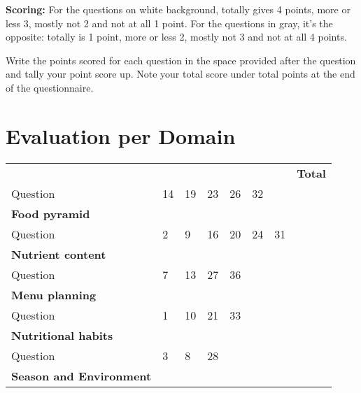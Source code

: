 \documentclass[../main.tex]{subfiles}
\begin{document}
\textbf{Scoring:} For the questions on white background, totally gives 4 points, more or less 3, mostly not 2 and not at all 1 point. For the questions in gray, it's the opposite:  totally is 1 point, more or less 2, mostly not 3 and not at all 4 points.

Write the points scored for each question in the space provided after the question and tally your point score up. Note your total score under total points at the end of the questionnaire.

\section{Evaluation per Domain}

\begin{tabular}{l|p{10mm}|p{10mm}|p{10mm}|p{10mm}|p{10mm}|p{10mm}||l}
  & & & & & & & \textbf{Total} \\
  \cellcolor{lightgray} Question & \cellcolor{lightgray} 14 &
  \cellcolor{lightgray} 19 & \cellcolor{lightgray} 23 &
  \cellcolor{lightgray} 26 & \cellcolor{lightgray} 32 &
  \cellcolor{lightgray} & \\
  \textbf{Food pyramid} & & & & & & & \\ \hline
  \cellcolor{lightgray} Question & \cellcolor{lightgray} 2
  & \cellcolor{lightgray} 9 & \cellcolor{lightgray} 16 &
  \cellcolor{lightgray} 20 & \cellcolor{lightgray} 24 &
  \cellcolor{lightgray} 31 & \\
  \textbf{Nutrient content} & & & & & & & \\ \hline
  \cellcolor{lightgray} Question & \cellcolor{lightgray} 7 &
  \cellcolor{lightgray} 13 & \cellcolor{lightgray} 27 &
  \cellcolor{lightgray} 36 & \cellcolor{lightgray}  & \cellcolor{lightgray} & \\
  \textbf{Menu planning} & & & & & & & \\ \hline
  \cellcolor{lightgray} Question & \cellcolor{lightgray} 1 & \cellcolor{lightgray} 10
  & \cellcolor{lightgray} 21 & \cellcolor{lightgray} 33 & \cellcolor{lightgray}
  & \cellcolor{lightgray}  & \\
  \textbf{Nutritional habits} & & & & & & & \\ \hline
  \cellcolor{lightgray} Question & \cellcolor{lightgray} 3 & \cellcolor{lightgray} 8 &
  \cellcolor{lightgray} 28 & \cellcolor{lightgray}  & \cellcolor{lightgray}  &
  \cellcolor{lightgray} & \\
  \textbf{Season and Environment} & & & & & & & \\ \hline

\end{tabular}
\end{document}
